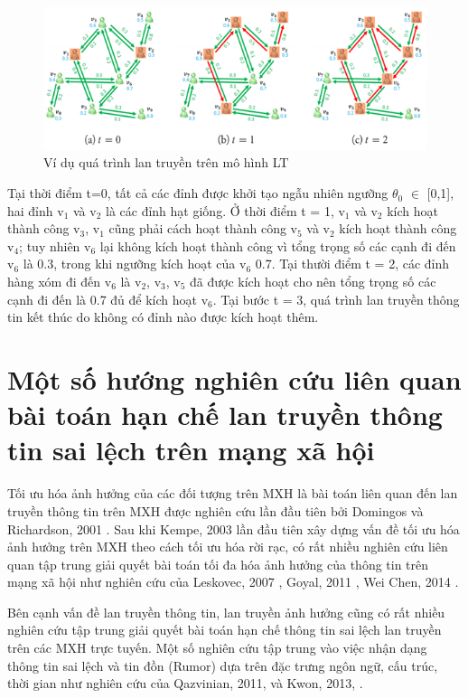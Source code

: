 	\begin{center}
		\begin{figure}[htp]
			\begin{center}
				\includegraphics [scale=.75]{picture/Hinh2_2}
			\end{center}
			\caption{Ví dụ quá trình lan truyền trên mô hình LT}
			\label{refhinh2_2}
		\end{figure}
	\end{center}	
	Tại thời điểm t=0, tất cả các đỉnh được khởi tạo ngẫu nhiên ngưỡng $\theta$$_{0}$ $\in$ [0,1], hai đỉnh v$_{1}$ và v$_{2}$ là các đỉnh hạt giống. Ở thời điểm t = 1, v$_{1}$ và v$_{2}$ kích hoạt thành công v$_{3}$, v$_{1}$ cũng phải cách hoạt thành công v$_{5}$ và v$_{2}$ kích hoạt thành công v$_{4}$; tuy nhiên v$_{6}$ lại không kích hoạt thành công vì tổng trọng số các cạnh đi đến v$_{6}$ là 0.3, trong khi ngưỡng kích hoạt của v$_{6}$ 0.7. Tại thười điểm t = 2, các đỉnh hàng xóm đi đến v$_{6}$ là v$_{2}$, v$_{3}$, v$_{5}$ đã được kích hoạt cho nên tổng trọng số các cạnh đi đến là 0.7 đủ để kích hoạt v$_{6}$. Tại bước t = 3, quá trình lan truyền thông tin kết thúc do không có đỉnh nào được kích hoạt thêm.

\section{Một số hướng nghiên cứu liên quan bài toán hạn chế lan truyền thông tin sai lệch trên mạng xã hội}
Tối ưu hóa ảnh hưởng của các đối tượng trên MXH là bài toán liên quan đến lan truyền thông tin trên MXH được nghiên cứu lần đầu tiên bởi Domingos và Richardson, 2001 \cite{pedro}. Sau khi Kempe, 2003 \cite{kemple1} lần đầu tiên xây dựng vấn đề tối ưu hóa ảnh hưởng trên MXH theo cách tối ưu hóa rời rạc, có rất nhiều nghiên cứu liên quan tập trung giải quyết bài toán tối đa hóa ảnh hưởng của thông tin trên mạng xã hội như nghiên cứu của Leskovec, 2007 \cite{leskovec}, Goyal, 2011 \cite{goyal}, Wei Chen, 2014 \cite{chen}.

Bên cạnh vấn đề lan truyền thông tin, lan truyền ảnh hưởng cũng có rất nhiều nghiên cứu tập trung giải quyết bài toán hạn chế thông tin sai lệch lan truyền trên các MXH trực tuyến. Một số nghiên cứu tập trung vào việc nhận dạng thông tin sai lệch và tin đồn (Rumor) dựa trên đặc trưng ngôn ngữ, cấu trúc, thời gian như nghiên cứu của Qazvinian, 2011, \cite{qazvin} và Kwon, 2013, \cite{kwon}.

